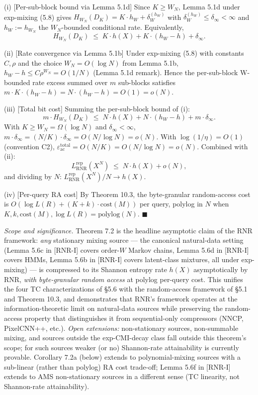 \documentclass[
]{article}
\begin{document}
(i) [Per-sub-block bound via Lemma 5.1d] Since $K \geq W_N$, Lemma 5.1d
under exp-mixing (5.8) gives
$H_{W_N}(D_K) = K \cdot h_W + \delta_W^{(h_W)}$
with $\delta_W^{(h_W)} \leq \delta_\infty < \infty$ and $h_W := h_{W_N}$
the $W_N$-bounded conditional rate. Equivalently,
\[
H_{W_N}(D_K) \;\leq\; K \cdot h(X) + K \cdot (h_W - h) + \delta_\infty.
\]

(ii) [Rate convergence via Lemma 5.1b] Under exp-mixing (5.8) with
constants $C, \rho$ and the choice $W_N = O(\log N)$ from Lemma 5.1b,
$h_W - h \leq C \rho^{W_N} = O(1/N)$ (Lemma 5.1d
remark). Hence the per-sub-block W-bounded rate excess summed
over $m$ sub-blocks satisfies $m \cdot K \cdot (h_W - h) =
N \cdot (h_W - h) = O(1) = o(N)$.

(iii) [Total bit cost] Summing the per-sub-block bound of (i):
\[
m \cdot H_{W_N}(D_K) \;\leq\; N \cdot h(X) + N \cdot (h_W - h) + m \cdot \delta_\infty.
\]
With $K \geq W_N = \Omega(\log N)$ and $\delta_\infty < \infty$,
$m \cdot \delta_\infty = (N/K) \cdot \delta_\infty = O(N/\log N) = o(N)$.
With $\log(1/\eta) = O(1)$ (convention C2),
$\varepsilon_{\mathrm{ac}}^{\mathrm{total}} = O(N/K) = O(N/\log N) = o(N)$.
Combined with (ii):
\[
L^{\mathrm{rep}}_{\mathrm{RNR}}(X^N) \;\leq\; N \cdot h(X) + o(N),
\]
and dividing by $N$: $L^{\mathrm{rep}}_{\mathrm{RNR}}(X^N) / N \to h(X)$.

(iv) [Per-query RA cost] By Theorem 10.3, the byte-granular
random-access cost is $O(\log L(R) + (K + k) \cdot \mathrm{cost}(M))$
per query, polylog in $N$ when $K, k, \mathrm{cost}(M), \log L(R) =
\mathrm{polylog}(N)$.
\hfill$\blacksquare$

\emph{Scope and significance.} Theorem 7.2 is the headline asymptotic
claim of the RNR framework: \emph{any} stationary mixing source --- the
canonical natural-data setting (Lemma 5.6c in [RNR-I] covers order-$W$ Markov
chains, Lemma 5.6d in [RNR-I] covers HMMs, Lemma 5.6b in [RNR-I] covers latent-class
mixtures, all under exp-mixing) --- is compressed to its Shannon
entropy rate $h(X)$ asymptotically by RNR, \emph{with byte-granular
random access} at polylog per-query cost. This unifies the four
TC characterizations of §5.6 with the random-access framework of
§5.1 and Theorem 10.3, and demonstrates that RNR's framework
operates at the information-theoretic limit on natural-data sources
while preserving the random-access property that distinguishes it
from sequential-only compressors (NNCP, PixelCNN++, etc.).
\emph{Open extensions:} non-stationary sources, non-summable mixing,
and sources outside the exp-CMI-decay class fall outside this
theorem's scope; for such sources weaker (or no) Shannon-rate
attainability is currently provable. Corollary 7.2a (below) extends
to polynomial-mixing sources with a sub-linear (rather than polylog)
RA cost trade-off; Lemma 5.6f in [RNR-I] extends to AMS non-stationary sources
in a different sense (TC linearity, not Shannon-rate attainability).
\end{document}
